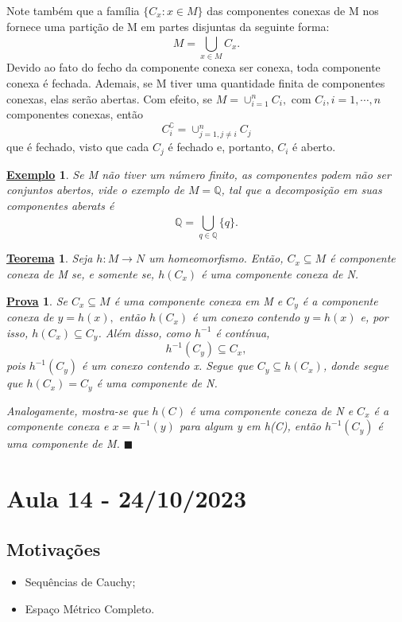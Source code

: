 \documentclass{article}
\newtheorem*{theorem*}{\underline{Teorema}}
\newtheorem{example}{\underline{Exemplo}}
\newtheorem*{proof*}{\underline{Prova}}
\renewcommand\qedsymbol{$\blacksquare$}
\begin{document}
  Note também que a família \(\{C_{x}: x\in M\}\) das componentes conexas de M nos fornece uma partição de M
em partes disjuntas da seguinte forma: 
  \[
    M = \bigcup_{x\in M}^{}{C_{x}}.
  \]
  Devido ao fato do fecho da componente conexa ser conexa, toda componente conexa é fechada. Ademais, se M tiver uma quantidade finita de componentes conexas,
elas serão abertas. Com efeito, se \(M = \cup_{i=1}^{n}C_{i},\) com \(C_{i}, i = 1,\cdots,n\) componentes conexas, então 
  \[
    C_{i}^{\complement} = \cup_{j=1, j\neq i}^{n}C_{j}
  \]
  que é fechado, visto que cada \(C_{j}\) é fechado e, portanto, \(C_{i}\) é aberto.
 \begin{example}
   Se M não tiver um número finito, as componentes podem não ser conjuntos abertos, vide o exemplo de \(M = \mathbb{Q}\), tal que a decomposição em suas componentes aberats é 
     \[
       \mathbb{Q} = \bigcup_{q\in \mathbb{Q}}^{}{\{q\}}.
     \]
 \end{example}
 \begin{theorem*}
   Seja \(h:M\rightarrow N\) um homeomorfismo. Então, \(C_{x}\subseteq{M}\) é componente conexa de M se, e somente se,
 \(h(C_{x})\) é uma componente conexa de N.
 \end{theorem*}
\begin{proof*}
  Se \(C_{x}\subseteq{M}\) é uma componente conexa em M e \(C_{y}\) é a componente conexa de \(y=h(x),\) então \(h(C_{x})\) é
um conexo contendo \(y = h(x)\) e, por isso, \(h(C_{x})\subseteq{C_{y}}\). Além disso, como \(h^{-1}\) é contínua, 
  \[
    h^{-1}(C_{y})\subseteq{C_{x}},
  \]
  pois \(h^{-1}(C_{y})\) é um conexo contendo x. Segue que \(C_{y}\subseteq{h(C_{x})}\), donde segue que \(h(C_{x}) = C_{y}\) é 
uma componente de N.

  Analogamente, mostra-se que \(h(C)\) é uma componente conexa de N e \(C_{x}\) é a componente conexa e \(x=h^{-1}(y)\) para algum y em h(C), então
 \(h^{-1}(C_{y})\) é uma componente de M. \qedsymbol
\end{proof*}
\newpage

\section{Aula 14 - 24/10/2023}
\subsection{Motivações} 
\begin{itemize}
  \item Sequências de Cauchy;
  \item Espaço Métrico Completo.
\end{itemize}
\end{document}
